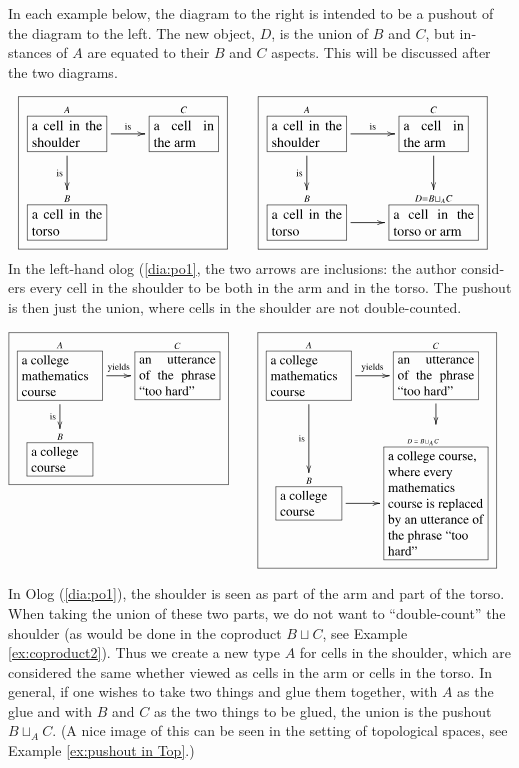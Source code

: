 \documentclass[a4paper]{book}
\def\tn{\textnormal}
\def\hsp{\hspace{.3in}}
\def\rr{\raggedright}
\newcommand{\LA}[2]{\ar[#1]^-{\tn {#2}}}
\newcommand{\LAL}[2]{\ar[#1]_-{\tn {#2}}}
\newcommand{\obox}[3]{\stackrel{#1}{\fbox{\parbox{#2}{#3}}}}
\theoremstyle{myth}
\newtheorem{exampleENG}[envENG]{\begin{english}Example\end{english}}
\newtheorem{exampleRUS}[envRUS]{\begin{russian}Пример\end{russian}}
\begin{document}
\begin{english}
\begin{exampleRUS}
\begin{russian} \end{russian}
\end{exampleRUS}

\begin{exampleENG}[Pushout]\label{ex:pushout}
In each example below, the diagram to the right is intended to be a pushout of the diagram to the left.  The new object, $D$, is the union of $B$ and $C$, but instances of $A$ are equated to their $B$ and $C$ aspects.  This will be discussed after the two diagrams.

\begin{align}
\label{dia:po1}\fbox{\xymatrixnocompile{\obox{A}{.7in}{a cell in the shoulder}\LA{r}{is}\LAL{d}{is}&\obox{C}{.6in}{a cell in the arm}\\\obox{B}{.7in}{a cell in the torso}}}\hsp&\fbox{\xymatrix{\obox{A}{.7in}{a cell in the shoulder}\LA{r}{is}\LAL{d}{is}&\obox{C}{.6in}{a cell in the arm}\LA{d}{}\\\obox{B}{.7in}{a cell in the torso}\LA{r}{}&\obox{D=B\sqcup_AC}{.8in}{a cell in the torso or arm}}}
\end{align}
In the left-hand olog (\ref{dia:po1}, the two arrows are inclusions: the author considers every cell in the shoulder to be both in the arm and in the torso. The pushout is then just the union, where cells in the shoulder are not double-counted.

\begin{align}\label{dia:po2}\fbox{\xymatrixnocompile@=18pt{\obox{A}{.8in}{\rr a college mathematics course}\LA{r}{yields}\LAL{d}{is}&\obox{C}{.8in}{an utterance of the phrase “too hard”}\\\obox{B}{.6in}{\rr a college course}}}\hsp&\fbox{\xymatrixnocompile@=18pt{\obox{A}{.8in}{\rr a college mathematics course}\LA{r}{yields}\LAL{d}{is}&\obox{C}{.8in}{an utterance of the phrase “too hard”}\LA{d}{}\\\obox{B}{.6in}{\rr a college course}\LA{r}{}&\obox{\parbox{.6in}{\vspace{.1in}\tiny$D=B\!\sqcup_A\!C$}}{1in}{\rr a college course, where every mathematics course is replaced by an utterance of the phrase “too hard”}}}
\end{align}

In Olog (\ref{dia:po1}), the shoulder is seen as part of the arm and part of the torso.  When taking the union of these two parts, we do not want to “double-count” the shoulder (as would be done in the coproduct $B\sqcup C$, see Example \ref{ex:coproduct2}).  Thus we create a new type $A$ for cells in the shoulder, which are considered the same whether viewed as cells in the arm or cells in the torso.  In general, if one wishes to take two things and glue them together, with $A$ as the glue and with $B$ and $C$ as the two things to be glued, the union is the pushout $B\sqcup_AC$. (A nice image of this can be seen in the setting of topological spaces, see Example \ref{ex:pushout in Top}.)


\end{exampleENG}
\end{english}
\end{document}
